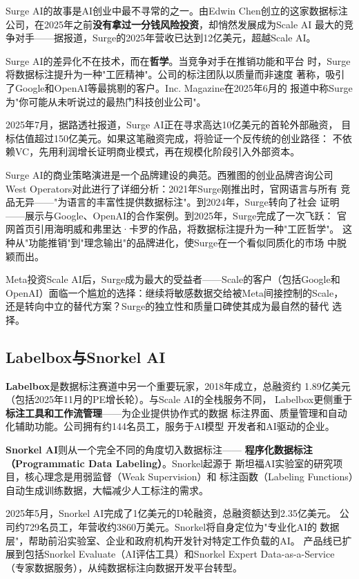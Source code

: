 Surge AI的故事是AI创业中最不寻常的之一。由Edwin Chen创立的这家数据标注
公司，在2025年之前\textbf{没有拿过一分钱风险投资}，却悄然发展成为Scale AI
最大的竞争对手——据报道，Surge的2025年营收已达到12亿美元，超越Scale AI。

Surge AI的差异化不在技术，而在\textbf{哲学}。当竞争对手在推销功能和平台
时，Surge将数据标注提升为一种"工匠精神"。公司的标注团队以质量而非速度
著称，吸引了Google和OpenAI等最挑剔的客户。Inc. Magazine在2025年6月的
报道中称Surge为"你可能从未听说过的最热门科技创业公司"。

2025年7月，据路透社报道，Surge AI正在寻求高达10亿美元的首轮外部融资，
目标估值超过150亿美元。如果这笔融资完成，将验证一个反传统的创业路径：
不依赖VC，先用利润增长证明商业模式，再在规模化阶段引入外部资本。

Surge AI的商业策略演进是一个品牌建设的典范。西雅图的创业品牌咨询公司
West Operators对此进行了详细分析：2021年Surge刚推出时，官网语言与所有
竞品无异——"为语言的丰富性提供数据标注"。到2024年，Surge转向了社会
证明——展示与Google、OpenAI的合作案例。到2025年，Surge完成了一次飞跃：
官网首页引用海明威和弗里达·卡罗的作品，将数据标注提升为一种"工匠哲学"。
这种从"功能推销"到"理念输出"的品牌进化，使Surge在一个看似同质化的市场
中脱颖而出。

Meta投资Scale AI后，Surge成为最大的受益者——Scale的客户（包括Google和
OpenAI）面临一个尴尬的选择：继续将敏感数据交给被Meta间接控制的Scale，
还是转向中立的替代方案？Surge的独立性和质量口碑使其成为最自然的替代
选择。

\subsection{Labelbox与Snorkel AI}
\label{subsec:labelbox-snorkel}

\textbf{Labelbox}是数据标注赛道中另一个重要玩家，2018年成立，总融资约
1.89亿美元（包括2025年11月的PE增长轮）。与Scale AI的全栈服务不同，
Labelbox更侧重于\textbf{标注工具和工作流管理}——为企业提供协作式的数据
标注界面、质量管理和自动化辅助功能。公司拥有约144名员工，服务于AI模型
开发者和AI驱动的企业。

\textbf{Snorkel AI}则从一个完全不同的角度切入数据标注——
\textbf{程序化数据标注（Programmatic Data Labeling）}。Snorkel起源于
斯坦福AI实验室的研究项目，核心理念是用弱监督（Weak Supervision）和
标注函数（Labeling Functions）自动生成训练数据，大幅减少人工标注的需求。

2025年5月，Snorkel AI完成了1亿美元的D轮融资，总融资额达到2.35亿美元。
公司约729名员工，年营收约3860万美元。Snorkel将自身定位为"专业化AI的
数据层"，帮助前沿实验室、企业和政府机构开发针对特定工作负载的AI。
产品线已扩展到包括Snorkel Evaluate（AI评估工具）和Snorkel Expert
Data-as-a-Service（专家数据服务），从纯数据标注向数据开发平台转型。


